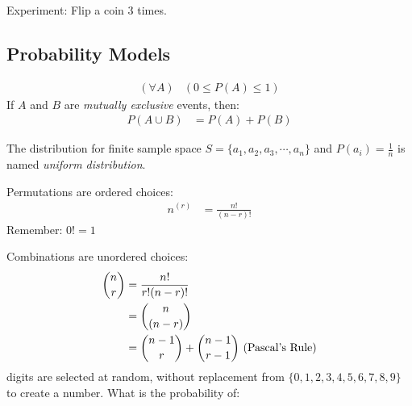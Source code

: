                 Experiment: Flip a coin 3 times.
                \subsection{Probability Models} %
                \label{sub:probability_models}
                    \begin{align*}
                        (\forall A) & (0 \le P(A) \le 1)
                    \end{align*}
                    If $A$ and $B$ are \emph{mutually exclusive} events, then:
                    \begin{align*}
                        P(A \cup B) &= P(A) + P(B)
                    \end{align*}

                    The distribution for finite sample space $S = \{ a_1, a_2, a_3, \cdots, a_n \}$ and $P(a_i) = \frac{1}{n}$ is named \emph{uniform distribution}.

                    Permutations are ordered choices:
                    \begin{align*}
                        n^{(r)} &= \frac{n!}{(n - r)!}
                    \end{align*}
                    Remember: $0! = 1$

                    Combinations are unordered choices:
                    \begin{align*}
                        \dbinom{n}{r} &= \frac{n!}{r! (n - r)!} \\
                        &= \dbinom{n}{(n - r)} \\
                        &= \dbinom{n-1}{r} + \dbinom{n-1}{r-1} \text{ (Pascal's Rule)}
                    \end{align*}
                     digits are selected at random, without replacement from $\{ 0, 1, 2, 3, 4, 5, 6, 7, 8, 9 \}$ to create a number.
                    What is the probability of:

